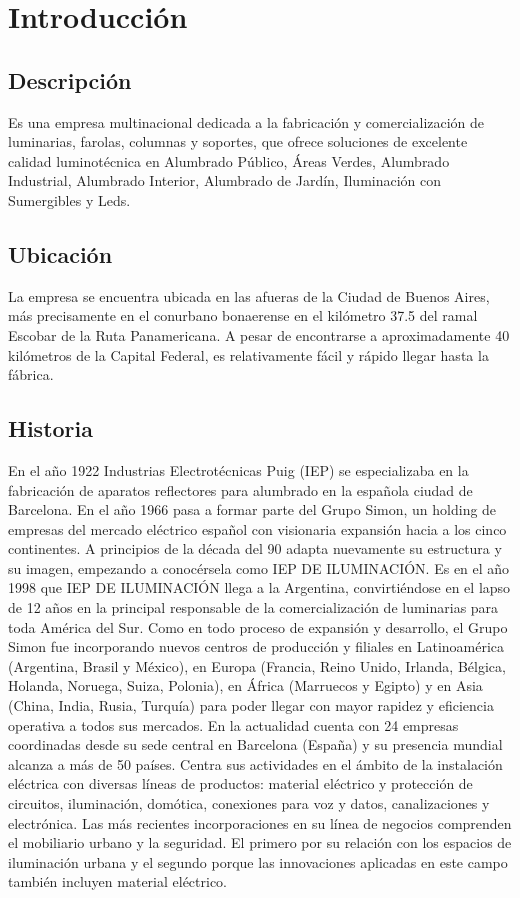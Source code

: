 \section{Introducci\'on}
\subsection{Descripción}
Es una empresa multinacional dedicada a la fabricación y comercialización de luminarias, farolas, columnas y soportes, que ofrece soluciones de excelente calidad luminotécnica en Alumbrado Público, Áreas Verdes, Alumbrado Industrial, Alumbrado Interior, Alumbrado de Jardín, Iluminación con Sumergibles y Leds.

\subsection{Ubicación}
La empresa se encuentra ubicada en las afueras de la Ciudad de Buenos Aires, m\'as precisamente en el conurbano bonaerense en el kil\'ometro 37.5 del ramal Escobar de la Ruta Panamericana. A pesar de encontrarse a aproximadamente 
40 kil\'ometros de la Capital Federal, es relativamente f\'acil y r\'apido llegar hasta la f\'abrica.

\subsection{Historia}
En el año 1922 Industrias Electrotécnicas Puig (IEP) se especializaba en la fabricación de aparatos reflectores para alumbrado en la española ciudad de Barcelona.
En el año 1966 pasa a formar parte del Grupo Simon, un holding de empresas del mercado eléctrico español con visionaria expansión hacia a los cinco continentes.
A principios de la década del 90 adapta nuevamente su estructura y su imagen, empezando a conocérsela como IEP DE ILUMINACIÓN.
Es en el año 1998 que IEP DE ILUMINACIÓN llega a la Argentina, convirtiéndose en el lapso de 12 años en la principal responsable de la comercialización de luminarias para toda América del Sur. 
Como en todo proceso de expansión y desarrollo, el Grupo Simon fue incorporando nuevos centros de producción y filiales en Latinoamérica (Argentina, Brasil y México), en Europa (Francia, Reino Unido, Irlanda, Bélgica, Holanda, Noruega, Suiza, Polonia), en África (Marruecos y Egipto) y en Asia (China, India, Rusia, Turquía) para poder llegar con mayor rapidez y eficiencia operativa a todos sus mercados.
En la actualidad cuenta con 24 empresas coordinadas desde su sede central en Barcelona (España) y su presencia mundial alcanza a más de 50 países. Centra sus actividades en el ámbito de la instalación eléctrica con diversas líneas de productos: material eléctrico y protección de circuitos, iluminación, domótica, conexiones para voz y datos, canalizaciones y electrónica. Las más recientes incorporaciones en su línea de negocios comprenden el mobiliario urbano y la seguridad. El primero por su relación con los espacios de iluminación urbana y el segundo porque las innovaciones aplicadas en este campo también incluyen material eléctrico.

